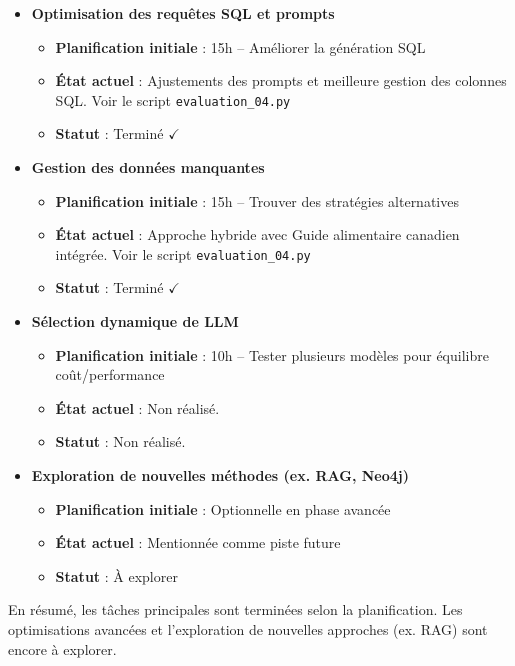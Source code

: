\documentclass[a4paper,11pt]{article}
\begin{document}
\begin{itemize}
    \item \textbf{Optimisation des requêtes SQL et prompts}
    \begin{itemize}
        \item \textbf{Planification initiale} : 15h -- Améliorer la génération SQL
        \item \textbf{État actuel} : Ajustements des prompts et meilleure gestion des colonnes SQL. Voir le script \texttt{evaluation\_04.py}
        \item \textbf{Statut} : Terminé $\checkmark$
    \end{itemize}
    
    \item \textbf{Gestion des données manquantes}
    \begin{itemize}
        \item \textbf{Planification initiale} : 15h -- Trouver des stratégies alternatives
        \item \textbf{État actuel} : Approche hybride avec Guide alimentaire canadien intégrée. Voir le script \texttt{evaluation\_04.py}
        \item \textbf{Statut} : Terminé $\checkmark$
    \end{itemize}
    
    \item \textbf{Sélection dynamique de LLM}
    \begin{itemize}
        \item \textbf{Planification initiale} : 10h -- Tester plusieurs modèles pour équilibre coût/performance
        \item \textbf{État actuel} : Non réalisé.
        \item \textbf{Statut} : Non réalisé.
    \end{itemize}
    
    \item \textbf{Exploration de nouvelles méthodes (ex. RAG, Neo4j)}
    \begin{itemize}
        \item \textbf{Planification initiale} : Optionnelle en phase avancée
        \item \textbf{État actuel} : Mentionnée comme piste future
        \item \textbf{Statut} : À explorer
    \end{itemize}
\end{itemize}

En résumé, les tâches principales sont terminées selon la planification. Les optimisations avancées et l’exploration de nouvelles approches (ex. RAG) sont encore à explorer. 
\end{document}
